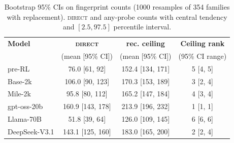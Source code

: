 \begin{table}[h]
\centering
\footnotesize
\caption{Bootstrap 95\% CIs on fingerprint counts (1000 resamples of 354 families with replacement). \textsc{direct} and any-probe counts with central tendency and $[2.5, 97.5]$ percentile interval.}
\label{tab:bootstrap_cis}
\vspace{4pt}
\setlength{\tabcolsep}{6pt}
\begin{tabular}{lccc}
\toprule
\textbf{Model} & \textbf{\textsc{direct}} & \textbf{rec. ceiling} & \textbf{Ceiling rank} \\
 & (mean [95\% CI]) & (mean [95\% CI]) & (95\% CI range) \\
\midrule
pre-RL & 76.0 [61, 92] & 152.4 [134, 171] & 5 [4, 5] \\
Base-2k & 106.0 [90, 123] & 170.3 [153, 189] & 3 [2, 4] \\
Mile-2k & 95.8 [80, 112] & 165.2 [147, 184] & 4 [3, 4] \\
gpt-oss-20b & 160.9 [143, 178] & 213.9 [196, 232] & 1 [1, 1] \\
Llama-70B & 51.8 [39, 64] & 126.0 [109, 145] & 6 [6, 6] \\
DeepSeek-V3.1 & 143.1 [125, 160] & 183.0 [165, 200] & 2 [2, 4] \\
\bottomrule
\end{tabular}
\end{table}
